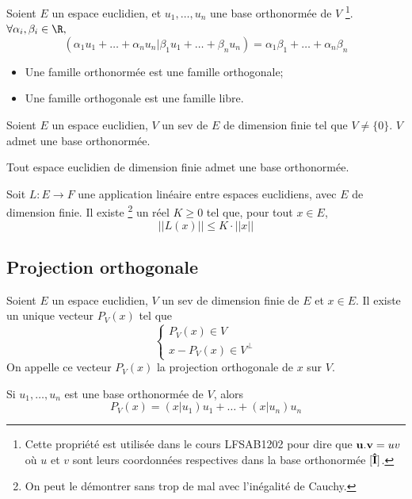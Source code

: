 \begin{myprop}
	Soient $E$ un espace euclidien, et $u_1, \ldots, u_n$ une base orthonormée de $V$
	\footnote{Cette propriété est utilisée dans le cours LFSAB1202 pour dire que ${\bf u}.{\bf v} = uv$
	où $u$ et $v$ sont leurs coordonnées respectives dans la base orthonormée $[{\bf\hat{I}}]$.}.
	$\forall \alpha_i, \beta_i \in \R,$
	$$(\alpha_1u_1 + \ldots + \alpha_nu_n | \beta_1u_1 + \ldots + \beta_nu_n) = \alpha_1\beta_1 + \ldots + \alpha_n\beta_n$$
\end{myprop}

\begin{myprop}\InsertTheoremBreak
	\begin{itemize}
		\item Une famille orthonormée est une famille orthogonale;
		\item Une famille orthogonale est une famille libre.
	\end{itemize}
\end{myprop}

\begin{myprop}
	Soient $E$ un espace euclidien, $V$ un sev de $E$ de dimension finie tel que $V \neq \{0\}$. $V$ admet une base orthonormée.
\end{myprop}

\begin{mycorr}
	Tout espace euclidien de dimension finie admet une base orthonormée.
\end{mycorr}

\begin{myprop}
	Soit $L : E \to F$ une application linéaire entre espaces euclidiens, avec $E$ de dimension finie.
	Il existe
	\footnote{On peut le démontrer sans trop de mal avec l'inégalité de Cauchy.}
	un réel $K \geq 0$ tel que, pour tout $x \in E$,
	\[ ||L(x)|| \leq K \cdot ||x|| \]
\end{myprop}

\subsection{Projection orthogonale}
\begin{mytheo}
	Soient $E$ un espace euclidien, $V$ un sev de dimension finie de $E$ et $x \in E$.
	Il existe un unique vecteur $P_V(x)$ tel que
	\[
	\left\{
	\begin{array}{l}
		P_V(x) \in V\\
		x - P_V(x) \in V^{\perp}
	\end{array}
	\right.
	\]
	On appelle ce vecteur $P_V(x)$ la projection orthogonale de $x$ sur $V$.

	Si $u_1, \ldots, u_n$ est une base orthonormée de $V$, alors
	\[ P_V(x) = (x|u_1)u_1 + \ldots + (x|u_n)u_n \]
\end{mytheo}

